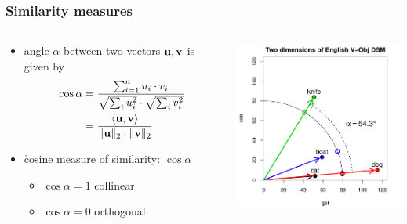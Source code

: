 \documentclass[t]{beamer} %
\begin{document}
\begin{frame}
  \frametitle{Similarity measures}
  
  \begin{columns}[c]
    \begin{column}{5cm}
      \begin{itemize}
        \item angle $\alpha$ between two vectors $\vu,\vv$ is given by
          \begin{align*}
            \cos \alpha &= 
            \frac{\sum_{i=1}^n u_i\cdot v_i}{
              \sqrt{\sum_i u_i^2}\cdot \sqrt{\sum_i v_i^2}}
            \\
            &= \frac{\sprod{\vu}{\vv}}{\norm[2]{\vu}\cdot \norm[2]{\vv}}
        \end{align*}
      \item<2-> \h{cosine} measure of similarity: $\cos \alpha$
        \begin{itemize}
        \item $\cos \alpha = 1$ \so collinear
        \item $\cos \alpha = 0$ \so orthogonal
        \end{itemize}
      \end{itemize}
    \end{column}
    \begin{column}{6cm}
      \includegraphics[width=6cm]{img/hieroglyph_2d_5}
    \end{column}
  \end{columns}
\end{frame}
\end{document}

